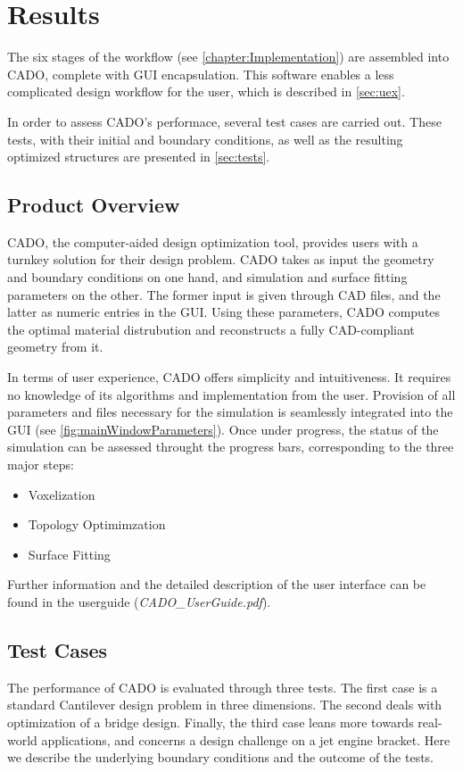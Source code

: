 \chapter{Results}
The six stages of the workflow (see \autoref{chapter:Implementation}) are assembled into CADO, complete with GUI encapsulation. This software enables a less complicated design workflow for the user, which is described in \autoref{sec:uex}. 

In order to assess CADO's performace, several test cases are carried out. These tests, with their initial and boundary conditions, as well as the resulting optimized structures are presented in \autoref{sec:tests}.

\section{Product Overview}
\label{sec:uex}
CADO, the computer-aided design optimization tool, provides users with a turnkey solution for their design problem. CADO takes as input the geometry and boundary conditions on one hand, and simulation and surface fitting parameters on the other. The former input is given through CAD files, and the latter as numeric entries in the GUI. Using these parameters, CADO computes the optimal material distrubution and reconstructs a fully CAD-compliant geometry from it.

In terms of user experience, CADO offers simplicity and intuitiveness. It requires no knowledge of its algorithms and implementation from the user. Provision of all parameters and files necessary for the simulation is seamlessly integrated into the GUI (see \autoref{fig:mainWindowParameters}). Once under progress, the status of the simulation can be assessed throught the progress bars, corresponding to the three major steps:
\begin{itemize}
\item Voxelization
\item Topology Optimimzation
\item Surface Fitting
\end{itemize}
Further information and the detailed description of the user interface can be found in the userguide (\textit{CADO\_UserGuide.pdf}).


\section{Test Cases}
\label{sec:tests}
The performance of CADO is evaluated through three tests. The first case is a standard Cantilever design problem in three dimensions. The second deals with optimization of a bridge design. Finally, the third case leans more towards real-world applications, and concerns a design challenge on a jet engine bracket. Here we describe the underlying boundary conditions and the outcome of the tests.

